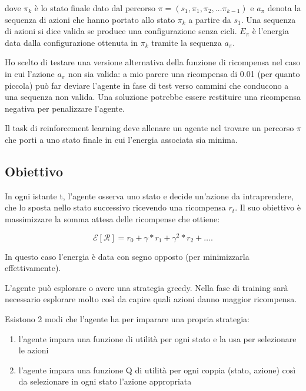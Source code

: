 \documentclass[conference]{IEEEtran}
\begin{document}
dove $\pi_k$ è lo stato finale dato dal percorso $\pi = (s_1, \pi_1, \pi_2, \dots \pi_{k-1})$ e $a_{\pi}$ denota la sequenza di azioni che hanno portato allo stato $\pi_k$ a partire da $s_1$. Una sequenza di azioni si dice valida se produce una configurazione senza cicli. $E_{\pi}$ è l'energia data dalla configurazione ottenuta in $\pi_k$ tramite la sequenza $a_{\pi}$.

Ho scelto di testare una versione alternativa della funzione di ricompensa nel caso in cui l'azione $a_{\pi}$ non sia valida: a mio parere una ricompensa di 0.01 (per quanto piccola) può far deviare l'agente in fase di test verso cammini che conducono a una sequenza non valida. Una soluzione potrebbe essere restituire una ricompensa negativa per penalizzare l'agente.

Il task di reinforcement learning deve allenare un agente nel trovare un percorso $\pi$ che porti a uno stato finale in cui l'energia associata sia minima.

\subsection{Obiettivo}

In ogni istante t, l'agente osserva uno stato e decide un'azione da intraprendere, che lo sposta nello stato successivo ricevendo una ricompensa $r_t$. Il suo obiettivo è massimizzare la somma attesa delle ricompense che ottiene:

\begin{equation}
\mathcal{E}[\mathcal{R}] = r_0 + \gamma*r_1 + \gamma^2*r_2 + \dots.
\end{equation}

In questo caso l'energia è data con segno opposto (per minimizzarla effettivamente).

L'agente può esplorare o avere una strategia greedy. Nella fase di training sarà necessario esplorare molto così da capire quali azioni danno maggior ricompensa.

Esistono 2 modi che l'agente ha per imparare una propria strategia:

\begin{enumerate}
 \item l'agente impara una funzione di utilità per ogni stato e la usa per selezionare le azioni
 \item l'agente impara una funzione Q di utilità per ogni coppia (stato, azione) così da selezionare in ogni stato l'azione appropriata
\end{enumerate}
\end{document}
